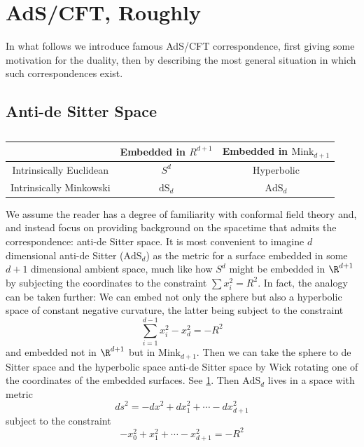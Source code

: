 \documentclass{report}
\begin{document}
\section{AdS/CFT, Roughly} 
In what follows we introduce famous AdS/CFT correspondence, first giving some 
motivation for the duality, then by describing the most general situation 
in which such correspondences exist.

\subsection{Anti-de Sitter Space}
\begin{table}
\centering
\begin{tabular}{c| c| c}
& Embedded in $ R^{d+1} $ & Embedded in $ \text{Mink}_{d+1} $ \\\hline 
Intrinsically Euclidean  & $ S^d $ & Hyperbolic\\
Intrinsically Minkowski  & $ \text{dS}_d $ & $ \text{AdS}_{d} $
\end{tabular}
\caption{}
\label{tab:ads-table}
\end{table}
We assume the reader has a degree of familiarity with conformal field theory 
and, and instead focus on providing background on the spacetime that admits the
correspondence: anti-de Sitter space. It is most convenient to imagine 
$ d $ dimensional anti-de Sitter ($ \text{AdS}_d $) as the metric for a surface
embedded in some $ d+1 $ dimensional ambient space, much like how $ S^d $ might 
be embedded in $ \R^{d+1} $ by subjecting the coordinates to the constraint 
$ \sum x_i^2 = R^2 $. In fact, the analogy can be taken further: We can 
embed not only the sphere but also a hyperbolic space of constant negative 
curvature, the latter being subject to the constraint 
\begin{equation*}
	\sum_{i=1}^{d-1} x_i^2  - x_d^2 = -R^2
\end{equation*}
and embedded not in $ \R^{d+1} $ but in $ \text{Mink}_{d+1} $.
Then we can take the sphere to de Sitter space and the hyperbolic space 
anti-de Sitter space by Wick rotating one of the coordinates of the embedded 
surfaces. See \cref{tab:ads-table}. Then $ \text{AdS}_{d} $ lives in a space 
with metric 
\begin{equation*}
	ds^2 = -dx^2 + dx_1^2 + \cdots - dx_{d+1}^2
\end{equation*}
subject to the constraint 
\begin{equation*}
	-x_0^2 + x_1^2 + \cdots - x_{d+1}^2 = -R^2
\end{equation*}
\end{document}
